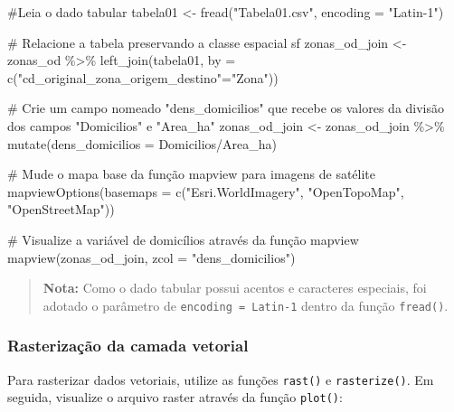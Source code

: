 \documentclass[
  letterpaper,
  DIV=11,
  numbers=noendperiod]{scrreprt}
\newenvironment{Shaded}{\begin{snugshade}}{\end{snugshade}}
\newcommand{\AttributeTok}[1]{\textcolor[rgb]{0.40,0.45,0.13}{#1}}
\newcommand{\CommentTok}[1]{\textcolor[rgb]{0.37,0.37,0.37}{#1}}
\newcommand{\FunctionTok}[1]{\textcolor[rgb]{0.28,0.35,0.67}{#1}}
\newcommand{\NormalTok}[1]{\textcolor[rgb]{0.00,0.23,0.31}{#1}}
\newcommand{\OtherTok}[1]{\textcolor[rgb]{0.00,0.23,0.31}{#1}}
\newcommand{\SpecialCharTok}[1]{\textcolor[rgb]{0.37,0.37,0.37}{#1}}
\newcommand{\StringTok}[1]{\textcolor[rgb]{0.13,0.47,0.30}{#1}}
\begin{document}
\begin{Shaded}
\begin{Highlighting}[]
\CommentTok{\#Leia o dado tabular}
\NormalTok{tabela01 }\OtherTok{\textless{}{-}} \FunctionTok{fread}\NormalTok{(}\StringTok{"Tabela01.csv"}\NormalTok{, }\AttributeTok{encoding =} \StringTok{"Latin{-}1"}\NormalTok{)}

\CommentTok{\# Relacione a tabela preservando a classe espacial \textquotesingle{}sf\textquotesingle{} }
\NormalTok{zonas\_od\_join }\OtherTok{\textless{}{-}}\NormalTok{ zonas\_od }\SpecialCharTok{\%\textgreater{}\%}
  \FunctionTok{left\_join}\NormalTok{(tabela01, }\AttributeTok{by =} \FunctionTok{c}\NormalTok{(}\StringTok{"cd\_original\_zona\_origem\_destino"}\OtherTok{=}\StringTok{"Zona"}\NormalTok{))}

\CommentTok{\# Crie um campo nomeado "dens\_domicilios" que recebe os valores da divisão dos campos "Domicilios" e "Area\_ha"}
\NormalTok{zonas\_od\_join }\OtherTok{\textless{}{-}}\NormalTok{ zonas\_od\_join }\SpecialCharTok{\%\textgreater{}\%}
  \FunctionTok{mutate}\NormalTok{(}\AttributeTok{dens\_domicilios =}\NormalTok{ Domicilios}\SpecialCharTok{/}\NormalTok{Area\_ha)}

\CommentTok{\# Mude o mapa base da função mapview para imagens de satélite }
\FunctionTok{mapviewOptions}\NormalTok{(}\AttributeTok{basemaps =} \FunctionTok{c}\NormalTok{(}\StringTok{"Esri.WorldImagery"}\NormalTok{, }\StringTok{"OpenTopoMap"}\NormalTok{, }\StringTok{"OpenStreetMap"}\NormalTok{))}

\CommentTok{\# Visualize a variável de domicílios através da função mapview}
\FunctionTok{mapview}\NormalTok{(zonas\_od\_join, }\AttributeTok{zcol =} \StringTok{"dens\_domicilios"}\NormalTok{)}
\end{Highlighting}
\end{Shaded}

\begin{quote}
\textbf{Nota:} Como o dado tabular possui acentos e caracteres
especiais, foi adotado o parâmetro de \texttt{encoding\ =\ Latin-1}
dentro da função \texttt{fread()}.
\end{quote}

\subsubsection{\texorpdfstring{\textbf{Rasterização da camada
vetorial}}{Rasterização da camada vetorial}}\label{rasterizauxe7uxe3o-da-camada-vetorial}

Para rasterizar dados vetoriais, utilize as funções \texttt{rast()} e
\texttt{rasterize()}. Em seguida, visualize o arquivo raster através da
função \texttt{plot()}:
\end{document}
